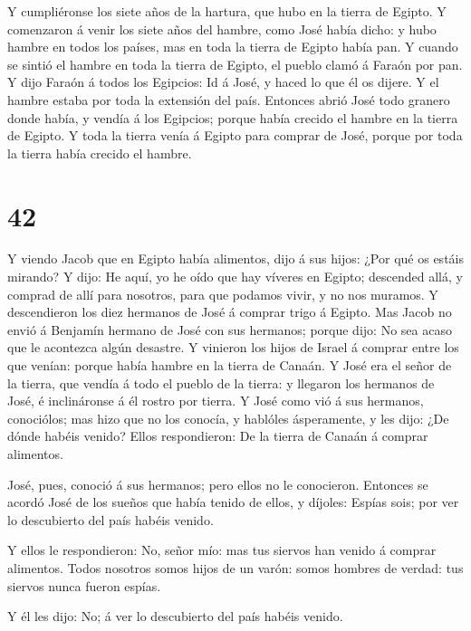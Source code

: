  Y cumpliéronse los siete años de la hartura, que hubo en
la tierra de Egipto.  Y comenzaron á venir los siete años
del hambre, como José había dicho: y hubo hambre en todos los países,
mas en toda la tierra de Egipto había pan.  Y cuando se
sintió el hambre en toda la tierra de Egipto, el pueblo clamó á Faraón
por pan. Y dijo Faraón á todos los Egipcios: Id á José, y haced lo que
él os dijere.  Y el hambre estaba por toda la extensión del
país. Entonces abrió José todo granero donde había, y vendía á los
Egipcios; porque había crecido el hambre en la tierra de Egipto.
 Y toda la tierra venía á Egipto para comprar de José,
porque por toda la tierra había crecido el hambre.

\hypertarget{section-41}{%
\section{42}\label{section-41}}

 Y viendo Jacob que en Egipto había alimentos, dijo á sus
hijos: ¿Por qué os estáis mirando?  Y dijo: He aquí, yo he
oído que hay víveres en Egipto; descended allá, y comprad de allí para
nosotros, para que podamos vivir, y no nos muramos.  Y
descendieron los diez hermanos de José á comprar trigo á Egipto.
 Mas Jacob no envió á Benjamín hermano de José con sus
hermanos; porque dijo: No sea acaso que le acontezca algún desastre.
 Y vinieron los hijos de Israel á comprar entre los que
venían: porque había hambre en la tierra de Canaán.  Y José
era el señor de la tierra, que vendía á todo el pueblo de la tierra: y
llegaron los hermanos de José, é inclináronse á él rostro por tierra.
 Y José como vió á sus hermanos, conociólos; mas hizo que no
los conocía, y hablóles ásperamente, y les dijo: ¿De dónde habéis
venido? Ellos respondieron: De la tierra de Canaán á comprar alimentos.

 José, pues, conoció á sus hermanos; pero ellos no le
conocieron.  Entonces se acordó José de los sueños que había
tenido de ellos, y díjoles: Espías sois; por ver lo descubierto del país
habéis venido.

 Y ellos le respondieron: No, señor mío: mas tus siervos
han venido á comprar alimentos.  Todos nosotros somos hijos
de un varón: somos hombres de verdad: tus siervos nunca fueron espías.

 Y él les dijo: No; á ver lo descubierto del país habéis
venido.

